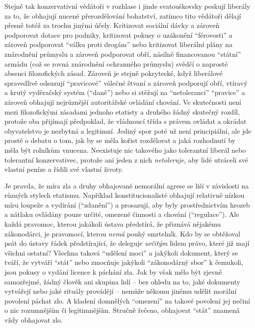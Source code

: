 \documentclass{book}
\begin{document}
Stejně tak konzervativní vědátoři v rozhlase i jinde svatouškovsky peskují liberály za to, že obhajují nucené přerozdělování bohatství, zatímco tito vědátoři dělají přesně totéž za trochu jinými účely. Kritizovat sociální dávky a zároveň podporovat dotace pro podniky, kritizovat pokusy o uzákonění \enquote{férovosti} a zároveň podporovat \enquote{válku proti drogám} nebo kritizovat liberální plány na znárodnění průmyslu a zároveň podporovat obří, násilně financovanou \enquote{státní} armádu (což se rovná znárodnění ochranného průmyslu) svědčí o naprosté absenci filozofických zásad. Zároveň je stejně pokrytecké, když liberálové spravedlivě odsuzují \enquote{pravicové} válečné štvaní a zároveň podporují obří, vtíravý a krutý vyděračský systém (\enquote{daně}) nebo si stěžují na \enquote{netoleranci} \enquote{pravice} a zároveň obhajují nejrůznější autoritářské ovládání chování. Ve skutečnosti není mezi filozofickými zásadami jednoho etatisty a druhého žádný skutečný rozdíl, protože oba přijímají předpoklad, že vládnoucí třída s právem ovládat a okrádat obyvatelstvo je nezbytná a legitimní. Jediný spor poté už není principiální, ale jde prostě o debatu o tom, jak by se měla kořist rozdělovat a jaká rozhodnutí by měla být rolníkům vnucena. Neexistuje nic takového jako tolerantní liberál nebo tolerantní konzervativec, protože ani jeden z nich \emph{netoleruje}, aby lidé utráceli své vlastní peníze a řídili své vlastní životy.

Je pravda, že míra zla a druhy obhajované nemorální agrese se liší v závislosti na různých stylech etatismu. Například konstitucionalisté obhajují relativně nízkou míru loupeže a vydírání (\enquote{zdanění}) a prosazují, aby byly prostřednictvím hrozeb a nátlaku ovládány pouze určité, omezené činnosti a chování (\enquote{regulace}). Ale každá pravomoc, kterou jakákoli ústava předstírá, že přiznává nějakému zákonodárci, je pravomocí, kterou \emph{nemá} pouhý smrtelník. Kdo by se obtěžoval psát do ústavy řádek předstírající, že deleguje \emph{určitým} lidem právo, které již mají všichni ostatní? Všechna taková \enquote{udělení moci} a jakýkoli dokument, který se tváří, že vytváří \enquote{stát} nebo zmocňuje jakýkoli \enquote{zákonodárný sbor} k čemukoli, jsou pokusy o vydání licence k páchání zla. Jak by však mělo být zjevně samozřejmé, žádný člověk ani skupina lidí -- bez ohledu na to, jaké dokumenty vytvářejí nebo jaké rituály provádějí -- nemůže někomu jinému udělit morální povolení páchat zlo. A kladení domnělých \enquote{omezení} na takové povolení jej nečiní o nic rozumnějším či legitimnějším. Stručně řečeno, obhajovat \enquote{stát} znamená vždy obhajovat zlo.
\end{document}
